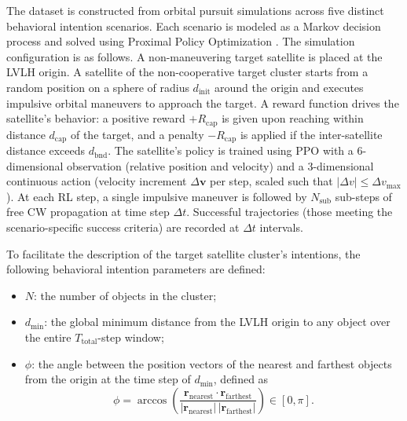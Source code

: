 \documentclass[a4paper,fleqn]{cas-dc}
\begin{document}
The dataset is constructed from orbital pursuit simulations across five distinct behavioral intention scenarios. Each scenario is modeled as a Markov decision process and solved using Proximal Policy Optimization \cite{schulman2017proximal}. The simulation configuration is as follows. A non-maneuvering target satellite is placed at the LVLH origin. A satellite of the non-cooperative target cluster starts from a random position on a sphere of radius $d_{\text{init}}$ around the origin and executes impulsive orbital maneuvers to approach the target. A reward function drives the satellite's behavior: a positive reward $+R_{\text{cap}}$ is given upon reaching within distance $d_{\text{cap}}$ of the target, and a penalty $-R_{\text{cap}}$ is applied if the inter-satellite distance exceeds $d_{\text{bnd}}$. The satellite's policy is trained using PPO with a 6-dimensional observation (relative position and velocity) and a 3-dimensional continuous action (velocity increment $\Delta \bm{v}$ per step, scaled such that $|\Delta v| \leq \Delta v_{\max}$). At each RL step, a single impulsive maneuver is followed by $N_{\text{sub}}$ sub-steps of free CW propagation at time step $\Delta t$. Successful trajectories (those meeting the scenario-specific success criteria) are recorded at $\Delta t$ intervals.

To facilitate the description of the target satellite cluster's intentions, the following behavioral intention parameters are defined:

\begin{itemize}
    \item $N$: the number of objects in the cluster;
    \item $d_{\min}$: the global minimum distance from the LVLH origin to any object over the entire $T_{\text{total}}$-step window;
    \item $\phi$: the angle between the position vectors of the nearest and farthest objects from the origin at the time step of $d_{\min}$, defined as
          \begin{equation}
              \phi = \arccos\left(\frac{\bm{r}_{\text{nearest}} \cdot \bm{r}_{\text{farthest}}}{|\bm{r}_{\text{nearest}}| \, |\bm{r}_{\text{farthest}}|}\right) \in [0, \pi].
          \end{equation}
\end{itemize}
\end{document}
